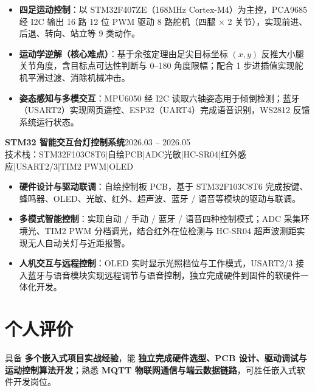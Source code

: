 \documentclass[10pt,a4paper]{article}
\newcommand{\projectblock}[3]{%
    {\bfseries\color{darktext}#1}\hfill{\color{graytext}#2}\\%
    {\small\color{graytext}#3}%
    \vspace{0.06em}%
}
\begin{document}
\begin{itemize}[leftmargin=1.5em, itemsep=1.5pt, parsep=0pt, topsep=1.5pt]
    \item \textbf{四足运动控制}：以 STM32F407ZE（168MHz Cortex-M4）为主控，PCA9685 经 I2C 输出 16 路 12 位 PWM 驱动 8 路舵机（四腿 $\times$ 2 关节），实现前进、后退、转向、站立等 9 类动作。
    \item \textbf{运动学逆解（核心难点）}：基于余弦定理由足尖目标坐标 $(x, y)$ 反推大小腿关节角度，含目标点可达性判断与 0\textdegree--180\textdegree{} 角度限幅；配合 1\textdegree{} 步进插值实现舵机平滑过渡、消除机械冲击。
    \item \textbf{姿态感知与多模交互}：MPU6050 经 I2C 读取六轴姿态用于倾倒检测；蓝牙（USART2）实现网页遥控、ESP32（UART4）完成语音识别，WS2812 反馈系统运行状态。
\end{itemize}

\vspace{0.06em}

\projectblock{STM32 智能交互台灯控制系统}{2026.03 -- 2026.05}{技术栈：STM32F103C8T6\hspace{0.3em}|\hspace{0.3em}自绘PCB\hspace{0.3em}|\hspace{0.3em}ADC光敏\hspace{0.3em}|\hspace{0.3em}HC-SR04\hspace{0.3em}|\hspace{0.3em}红外感应\hspace{0.3em}|\hspace{0.3em}USART2/3\hspace{0.3em}|\hspace{0.3em}TIM2 PWM\hspace{0.3em}|\hspace{0.3em}OLED}

\begin{itemize}[leftmargin=1.5em, itemsep=1.5pt, parsep=0pt, topsep=1.5pt]
    \item \textbf{硬件设计与驱动联调}：自绘控制板 PCB，基于 STM32F103C8T6 完成按键、蜂鸣器、OLED、光敏、红外、超声波、蓝牙 / 语音等模块的驱动与联调。
    \item \textbf{多模式智能控制}：实现自动 / 手动 / 蓝牙 / 语音四种控制模式；ADC 采集环境光、TIM2 PWM 分档调光，结合红外在位检测与 HC-SR04 超声波测距实现无人自动关灯与近距报警。
    \item \textbf{人机交互与远程控制}：OLED 实时显示光照档位与工作模式，USART2/3 接入蓝牙与语音模块实现远程调节与语音控制，独立完成硬件到固件的软硬件一体化开发。
\end{itemize}

\vspace{0.06em}

\section{\faUser\hspace{0.4em}个人评价}

具备 \textbf{多个嵌入式项目实战经验}，能 \textbf{独立完成硬件选型、PCB 设计、驱动调试与运动控制算法开发}；熟悉 \textbf{MQTT 物联网通信与端云数据链路}，可胜任嵌入式软件开发岗位。
\end{document}
